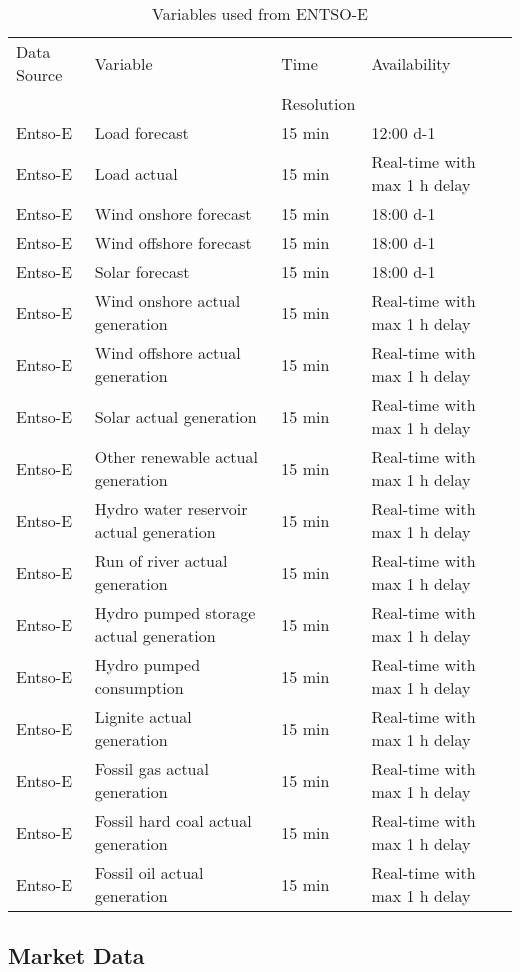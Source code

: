 \documentclass[class=scrbook, crop=false]{standalone}
\begin{document}
\begin{table}[]
\centering
\begin{tabular}{l|l|l|l}
 Data Source & Variable &  Time  & Availability  \\
 &&Resolution&\\\hline
 Entso-E & Load forecast & 15 min  & 12:00 d-1 \\
 Entso-E & Load actual & 15 min  & Real-time with max 1 h delay \\
 Entso-E & Wind onshore forecast & 15 min  & 18:00 d-1\\
 Entso-E & Wind offshore forecast & 15 min & 18:00 d-1 \\
 Entso-E & Solar forecast & 15 min & 18:00 d-1 \\
 Entso-E & Wind onshore actual generation & 15 min  & Real-time with max 1 h delay\\
 Entso-E & Wind offshore actual generation & 15 min & Real-time with max 1 h delay \\
 Entso-E & Solar actual generation & 15 min & Real-time with max 1 h delay \\
 Entso-E & Other renewable actual generation & 15 min & Real-time with max 1 h delay \\
 Entso-E & Hydro water reservoir actual generation & 15 min & Real-time with max 1 h delay \\
 Entso-E & Run of river actual generation & 15 min & Real-time with max 1 h delay \\
 Entso-E & Hydro pumped storage actual generation & 15 min & Real-time with max 1 h delay \\
 Entso-E & Hydro pumped consumption & 15 min & Real-time with max 1 h delay \\
 Entso-E & Lignite actual generation & 15 min & Real-time with max 1 h delay \\
 Entso-E & Fossil gas actual generation & 15 min & Real-time with max 1 h delay \\
 Entso-E & Fossil hard coal actual generation & 15 min & Real-time with max 1 h delay \\
 Entso-E & Fossil oil actual generation & 15 min & Real-time with max 1 h delay \\
  
\end{tabular}
\caption{Variables used from ENTSO-E}
\label{Table::Energy_Data_Entsoe}
\end{table}

\subsection{Market Data}
\label{Section::Market_Data}
\end{document}
